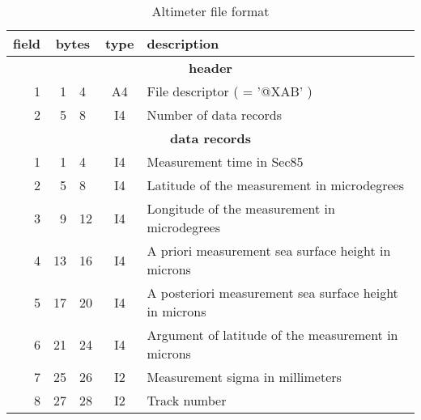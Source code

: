 \begin{table}
\caption{Altimeter file format}
\medskip
\begin{tabular}{|rr@{--}lc|p{}|}
\hline
field&\multicolumn{2}{c}{bytes}&type&description \\
\hline
\multicolumn{5}{c}{\bf header} \\
\hline
 1 & 1 & 4 & A4 & File descriptor ( = '@XAB' ) \\
 2 & 5 & 8 & I4 & Number of data records \\
\hline
\multicolumn{5}{c}{\bf data records} \\
\hline
 1 & 1 & 4 & I4 & Measurement time in Sec85 \\
 2 & 5 & 8 & I4 & Latitude of the measurement in microdegrees \\
 3 & 9 &12 & I4 & Longitude of the measurement in microdegrees \\
 4 &13 &16 & I4 & A priori measurement sea surface height in microns \\
 5 &17 &20 & I4 & A posteriori measurement sea surface height in microns \\
 6 &21 &24 & I4 & Argument of latitude of the measurement in microns \\
 7 &25 &26 & I2 & Measurement sigma in millimeters \\
 8 &27 &28 & I2 & Track number \\
\hline
\end{tabular}
\end{table}

